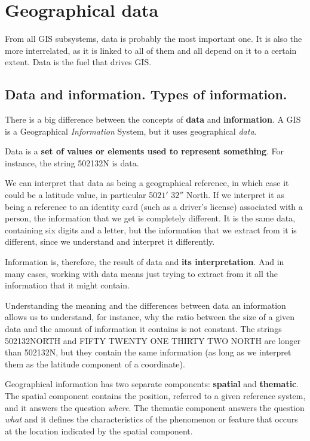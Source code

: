 

\chapter{Geographical data}

\pagestyle{fancy}

From all GIS subsystems, data is probably the most important one. It is also the more interrelated, as it is linked to all of them and all depend on it to a certain extent. Data is the fuel that drives GIS. 

\section{Data and information. Types of information.}

There is a big difference between the concepts of \textbf{data} and \textbf{information}. A GIS is a Geographical \emph{Information} System, but it uses geographical \emph{data}.

Data is a \textbf{set of values or elements used to represent something}. For instance, the string 502132N is data.

We can interpret that data as being a geographical reference, in which case it could be a latitude value, in particular 50\degree $21'$ $32''$ North. If we interpret it as being a reference to an identity card (such as a driver's license) associated with a person, the information that we get is completely different. It is the same data, containing six digits and a letter, but the information that we extract from it is different, since we understand and interpret it differently.

Information is, therefore, the result of data and \textbf{its interpretation}. And in many cases, working with data means just trying to extract from it all the information that it might contain.

Understanding the meaning and the differences between data an information allows us to understand, for instance, why the ratio between the size of a given data and the amount of information it contains is not constant. The strings 502132NORTH and FIFTY TWENTY ONE THIRTY TWO NORTH are longer than 502132N, but they contain the same information (as long as we interpret them as the latitude component of a coordinate).

Geographical information has two separate components: \textbf{spatial} and \textbf{thematic}. The spatial component contains the position, referred to a given reference system, and it answers the question \emph{where}. The thematic component answers the question \emph{what} and it defines the characteristics of the phenomenon or feature that occurs at the location indicated by the spatial component.

